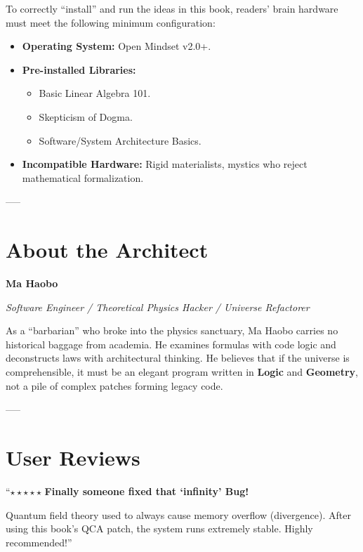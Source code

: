 \documentclass[11pt,a4paper,twoside]{book}
\begin{document}
To correctly ``install'' and run the ideas in this book, readers' brain hardware must meet the following minimum configuration:

\begin{itemize}
\item \textbf{Operating System:} Open Mindset v2.0+.

\item \textbf{Pre-installed Libraries:}

\begin{itemize}
\item Basic Linear Algebra 101.

\item Skepticism of Dogma.

\item Software/System Architecture Basics.
\end{itemize}

\item \textbf{Incompatible Hardware:} Rigid materialists, mystics who reject mathematical formalization.
\end{itemize}

-----

\section{About the Architect}

\textbf{Ma Haobo}

\textit{Software Engineer / Theoretical Physics Hacker / Universe Refactorer}

As a ``barbarian'' who broke into the physics sanctuary, Ma Haobo carries no historical baggage from academia. He examines formulas with code logic and deconstructs laws with architectural thinking. He believes that if the universe is comprehensible, it must be an elegant program written in \textbf{Logic} and \textbf{Geometry}, not a pile of complex patches forming legacy code.

-----

\section{User Reviews}

``$\star\star\star\star\star$ \textbf{Finally someone fixed that `infinity' Bug!}

Quantum field theory used to always cause memory overflow (divergence). After using this book's QCA patch, the system runs extremely stable. Highly recommended!''
\end{document}
